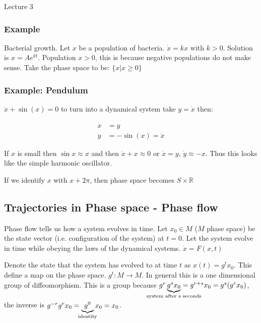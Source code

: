 \begin{center}

Lecture 3

\end{center}

\subsubsection*{Example}

Bacterial growth. Let $x$ be a population of bacteria. $\dot{x} = k x$ with $k > 0$. Solution is $x = A e^{kt}$. Population $x > 0$, this is because negative populations do not make sense. Take the phase space to be: $\{x | x \geq 0\}$

\subsubsection*{Example: Pendulum}

$\ddot{x} + \sin (x) = 0$ to turn into a dynamical system take $y=\dot{x}$ then:

\begin{align*}
\dot{x} &= y \\
\dot{y} &= - \sin (x) = \ddot{x}
\end{align*}

If $x$ is small then $\sin x \approx x$ and then $\ddot{x} + x \approx 0$ or $\dot{x} = y$, $\dot{y} \approx -x$. Thus this looks like the simple harmonic oscillator.


If we identify $x$ with $x + 2\pi$, then phase space becomes $S \times \mathbb{R}$

\subsection{Trajectories in Phase space - Phase flow}

Phase flow tells us how a system evolves in time. Let $x_0 \in M$ ($M$ phase space) be the state vector (i.e. configuration of the system) at $t=0$. Let the system evolve in time while obeying the laws of the dynamical systems. $\dot{x} = F (x, t)$

Denote the state that the system has evolved to at time $t$ as $x(t) = g^t x_0$. This define a map on the phase space. $g^t : M \rightarrow M$. In general this is a one dimensional group of diffeomorphism. This is a group because $g^r \underbrace{g^s x_0}_{\mathclap{\text{system after s seconds}}} = g^{r+s} x_0 = g^s (g^r x_0)$, the inverse is $g^{-r} g^r x_0 = \underbrace{g^0}_{\mathclap{\text{identity}}} x_0 = x_0$.

